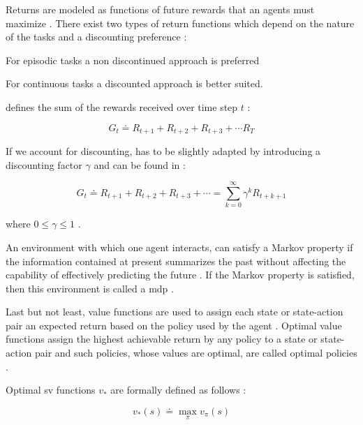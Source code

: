 \documentclass[draft=false]{seal_thesis}
\begin{document}
Returns are modeled as functions of future rewards that an agents must maximize \citep[p. 73]{Sutton2017}. There exist two types of return functions which depend on the nature of the tasks and a discounting preference \citep[p. 73]{Sutton2017}:
\begin{enumerate*}
	\item For episodic tasks a non discontinued approach is preferred
	\item For continuous tasks a discounted approach is better suited.
\end{enumerate*}

 defines the sum of the rewards received over time step $t$ \citep[p. 73]{Sutton2017}:

\begin{equation}
\label{eq:expected_return}
	G_t  \doteq R_{t+1} + R_{t+2} + R_{t+3} + \cdots R_{T}
\end{equation}

If we account for discounting,  has to be slightly adapted by introducing a discounting factor $\gamma$ and can be found in :

\begin{equation}
\label{eq:expected_discounted_return}
	G_t  \doteq R_{t+1} + R_{t+2} + R_{t+3} + \cdots = \sum_{k=0}^\infty \gamma^k R_{t+k+1}
\end{equation}

where $0 \leq \gamma \leq 1$ \citep[p. 73]{Sutton2017}.

An environment  with which one agent interacts, can satisfy a Markov property if the information contained at present summarizes the past without affecting the capability of effectively predicting the future \citep[p. 73]{Sutton2017}. If the Markov property is satisfied, then this environment is called a \gls{mdp} \citep[p. 73]{Sutton2017}.

Last but not least, value functions are used to assign each state or state-action pair an expected return based on the policy used by the agent \citep[p. 74]{Sutton2017}. Optimal value functions assign the highest achievable return by any policy to a state or state-action pair  and such policies, whose values are optimal, are called optimal policies \citep[p. 74]{Sutton2017}.

Optimal \gls{sv} functions $v_*$ are formally defined as follows \citep[p. 74]{Sutton2017}:

\begin{equation}
	v_* (s) \doteq \max_\pi v_\pi (s)
\end{equation}
\end{document}
